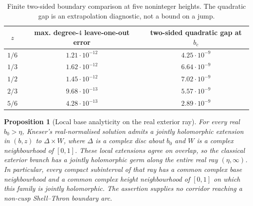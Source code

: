 \documentclass[11pt]{amsart}
\newtheorem{proposition}[theorem]{Proposition}
\theoremstyle{definition}
\begin{document}
\begin{table}[htbp]
\centering
\caption{Finite two-sided boundary comparison at five noninteger heights.
The quadratic gap is an extrapolation diagnostic, not a bound on a jump.}
\label{tab:bnd-multiheight}
\begin{tabular}{ccc}
\toprule
$z$ & max. degree-$4$ leave-one-out error & two-sided quadratic gap at $b_c$\\
\midrule
$1/6$ & $1.21\cdot10^{-12}$ & $4.25\cdot10^{-9}$\\
$1/3$ & $1.62\cdot10^{-12}$ & $6.64\cdot10^{-9}$\\
$1/2$ & $1.45\cdot10^{-12}$ & $7.02\cdot10^{-9}$\\
$2/3$ & $9.68\cdot10^{-13}$ & $5.57\cdot10^{-9}$\\
$5/6$ & $4.28\cdot10^{-13}$ & $2.89\cdot10^{-9}$\\
\bottomrule
\end{tabular}
\end{table}

\begin{proposition}[Local base analyticity on the real exterior ray]
\label{prop:exterior-real-parameter}
For every real $b_0>\eta$, Kneser's real-normalised solution admits a
jointly holomorphic extension in $(b,z)$ to $\Delta\times W$, where
$\Delta$ is a complex disc about $b_0$ and $W$ is a complex
neighbourhood of $[0,1]$.  These local extensions agree on overlap,
so the classical exterior branch has a jointly holomorphic germ along
the entire real ray $(\eta,\infty)$.  In particular, every compact
subinterval of that ray has a common complex base neighbourhood and a
common complex height neighbourhood of $[0,1]$ on which this family is
jointly holomorphic.  The assertion supplies no
corridor reaching a non-cusp Shell--Thron boundary arc.
\end{proposition}
\end{document}
